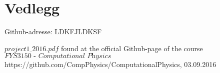 \documentclass{article}
\begin{document}
\section{Vedlegg}
Github-adresse: LDKFJLDKSF

%




\begin{thebibliography}{9}

  $project1\_2016.pdf$
  found at the official Github-page of the course $\textit{FYS3150 - Computational Physics}$
  https://github.com/CompPhysics/ComputationalPhysics,
  03.09.2016
  
    
\end{thebibliography}
\end{document}
